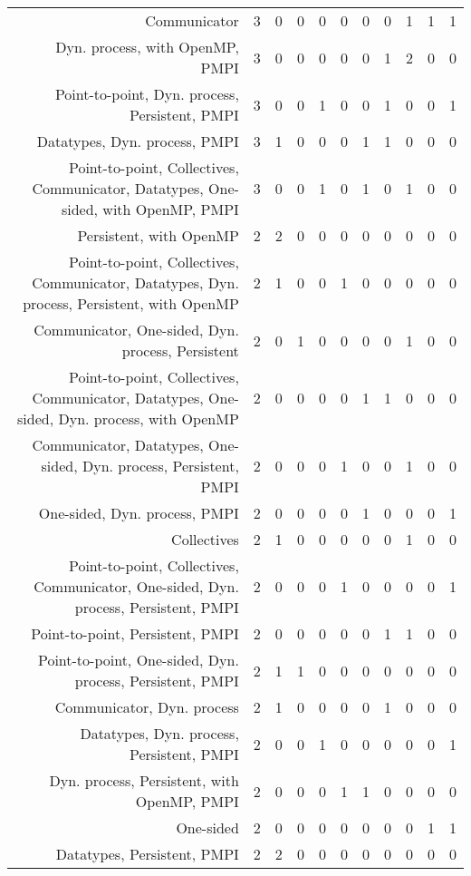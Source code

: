 {\begin{landscape}
\begin{longtable}[htb]{r|c|c|c|c|c|c|c|c|c|c}
{Communicator} & 3 & 0 & 0 & 0 & 0 & 0 & 0 & 1 & 1 & 1 \\%
{Dyn. process, with OpenMP, PMPI} & 3 & 0 & 0 & 0 & 0 & 0 & 1 & 2 & 0 & 0 \\%
{Point-to-point, Dyn. process, Persistent, PMPI} & 3 & 0 & 0 & 1 & 0 & 0 & 1 & 0 & 0 & 1 \\%
{Datatypes, Dyn. process, PMPI} & 3 & 1 & 0 & 0 & 0 & 1 & 1 & 0 & 0 & 0 \\%
{Point-to-point, Collectives, Communicator, Datatypes, One-sided, with OpenMP, PMPI} & 3 & 0 & 0 & 1 & 0 & 1 & 0 & 1 & 0 & 0 \\%
{Persistent, with OpenMP} & 2 & 2 & 0 & 0 & 0 & 0 & 0 & 0 & 0 & 0 \\%
{Point-to-point, Collectives, Communicator, Datatypes, Dyn. process, Persistent, with OpenMP} & 2 & 1 & 0 & 0 & 1 & 0 & 0 & 0 & 0 & 0 \\%
{Communicator, One-sided, Dyn. process, Persistent} & 2 & 0 & 1 & 0 & 0 & 0 & 0 & 1 & 0 & 0 \\%
{Point-to-point, Collectives, Communicator, Datatypes, One-sided, Dyn. process, with OpenMP} & 2 & 0 & 0 & 0 & 0 & 1 & 1 & 0 & 0 & 0 \\%
{Communicator, Datatypes, One-sided, Dyn. process, Persistent, PMPI} & 2 & 0 & 0 & 0 & 1 & 0 & 0 & 1 & 0 & 0 \\%
{One-sided, Dyn. process, PMPI} & 2 & 0 & 0 & 0 & 0 & 1 & 0 & 0 & 0 & 1 \\%
{Collectives} & 2 & 1 & 0 & 0 & 0 & 0 & 0 & 1 & 0 & 0 \\%
{Point-to-point, Collectives, Communicator, One-sided, Dyn. process, Persistent, PMPI} & 2 & 0 & 0 & 0 & 1 & 0 & 0 & 0 & 0 & 1 \\%
{Point-to-point, Persistent, PMPI} & 2 & 0 & 0 & 0 & 0 & 0 & 1 & 1 & 0 & 0 \\%
{Point-to-point, One-sided, Dyn. process, Persistent, PMPI} & 2 & 1 & 1 & 0 & 0 & 0 & 0 & 0 & 0 & 0 \\%
{Communicator, Dyn. process} & 2 & 1 & 0 & 0 & 0 & 0 & 1 & 0 & 0 & 0 \\%
{Datatypes, Dyn. process, Persistent, PMPI} & 2 & 0 & 0 & 1 & 0 & 0 & 0 & 0 & 0 & 1 \\%
{Dyn. process, Persistent, with OpenMP, PMPI} & 2 & 0 & 0 & 0 & 1 & 1 & 0 & 0 & 0 & 0 \\%
{One-sided} & 2 & 0 & 0 & 0 & 0 & 0 & 0 & 0 & 1 & 1 \\%
{Datatypes, Persistent, PMPI} & 2 & 2 & 0 & 0 & 0 & 0 & 0 & 0 & 0 & 0 \\%

\end{longtable}
\end{landscape}}
